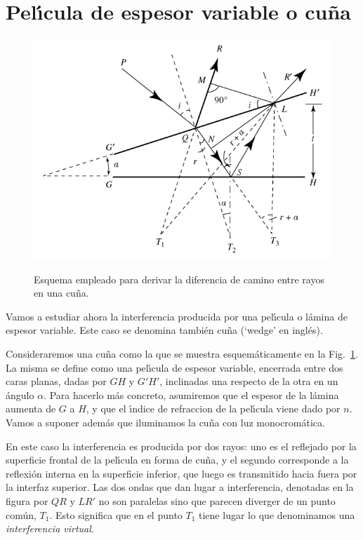 \documentclass[a4paper]{article}
\begin{document}
\section{Pel\'\i cula de espesor variable o cu\~na}

\begin{figure}
    \centering
    \includegraphics[scale=0.5]{wedge.png}
    \label{fig:cuna}
    \caption{Esquema empleado para derivar la diferencia de camino entre rayos
        en una cu\~na.}
\end{figure}
Vamos a estudiar ahora la interferencia producida por una pel\'\i cula o 
l\'amina de espesor variable. Este caso se denomina tambi\'en cu\~na (`wedge'
en ingl\'es). 

Consideraremos una cu\~na como la que se muestra esquem\'aticamente en la
Fig.~\ref{fig:cuna}. La misma se define como una pel\'\i cula de espesor
variable, encerrada entre dos caras planas, dadas por $GH$ y $G'H'$, inclinadas
una respecto de la otra en un \'angulo $\alpha$. Para hacerlo m\'as concreto,
asumiremos que el espesor de la l\'amina aumenta de $G$ a $H$, y que el 
\'\i ndice de refraccion de la pel\'\i cula viene dado por $n$. Vamos a suponer
adem\'as que iluminamos la cu\~na con luz monocrom\'atica. 

En este caso la interferencia es producida por dos rayos: uno es el reflejado 
por la superficie frontal de la pel\'\i cula en forma de cu\~na, y el segundo 
corresponde a la reflexi\'on interna en la superficie inferior, que luego
es transmitido hacia fuera por la interfaz superior. Las dos ondas que dan
lugar a interferencia, denotadas en la figura por $QR$ y $LR'$ no son paralelas
sino que parecen diverger de un punto com\'un, $T_1$. Esto significa que en
el punto $T_1$ tiene lugar lo que denominamos una {\it interferencia virtual}.
\end{document}
